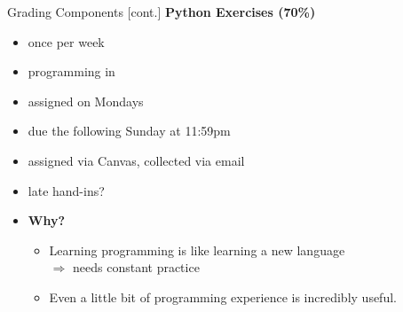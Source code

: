 \documentclass[professionalfonts, xcolor={usenames,svgnames,x11names,table}]{beamer}
\begin{document}
\begin{frame}{Grading Components [cont.]}
    \textbf{Python Exercises (70\%)}
        \begin{itemize}
            \item once per week
            \item programming in 
            \item assigned on Mondays 
            \item due the following Sunday at 11:59pm
            \item assigned via  Canvas, collected via email
            \item late hand-ins?
            \item \textbf{Why?}
                \begin{itemize}
                    \item Learning programming is like learning a new language\\
                            $\Rightarrow$ needs constant practice
                    \item Even a little bit of programming experience is incredibly useful.
                \end{itemize}
        \end{itemize}
\end{frame}
\end{document}
